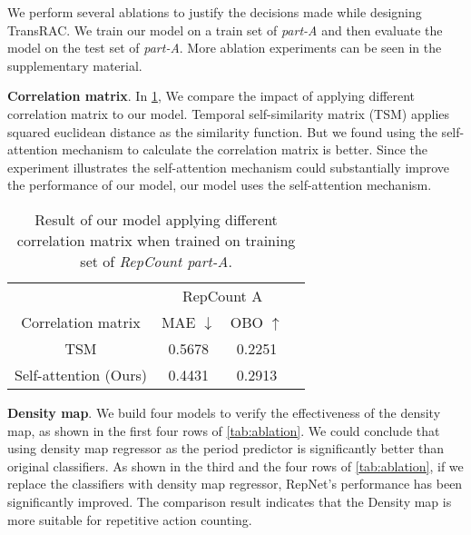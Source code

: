 \documentclass[10pt,twocolumn,letterpaper]{article}
\begin{document}
We perform several ablations to justify the decisions made while designing TransRAC. We train our model on a train set of \emph{part-A} and then evaluate the model on the test set of \emph{part-A}. More ablation experiments can be seen in the supplementary material.

\noindent \textbf{Correlation matrix}. In \cref{tab:TSM}, We compare the impact of applying different correlation matrix to our model. Temporal self-similarity matrix (TSM) \cite{RepNet} applies squared euclidean distance as the similarity function. But we found using the self-attention mechanism to calculate the correlation matrix is better. Since the experiment illustrates the self-attention mechanism could substantially improve the performance of our model, our model uses the self-attention mechanism.

\begin{table}[ht]
\centering
\begin{tabular}{c|c|cc} 
\cline{1-3}
               & \multicolumn{2}{c}{RepCount A} &   \\ 
\cline{1-3}
Correlation matrix  & MAE $\downarrow$  & OBO $\uparrow$ &   \\ 
\cline{1-3}
TSM          & 0.5678 & 0.2251                &   \\
Self-attention (Ours) & 0.4431 & 0.2913                &   \\
\cline{1-3}
\end{tabular}
\caption{
Result of our model applying different correlation matrix when trained on training set of \emph{RepCount part-A}.
}
\label{tab:TSM}
\end{table}

\noindent \textbf{Density map}. We build four models to verify the effectiveness of the density map, as shown in the first four rows of \cref{tab:ablation}. We could conclude that using density map regressor as the period predictor is significantly better than original classifiers. As shown in the third and the four rows of \cref{tab:ablation}, if we replace the classifiers with density map regressor, RepNet's performance has been significantly improved. The comparison result indicates that the Density map is more suitable for repetitive action counting. 
\end{document}
